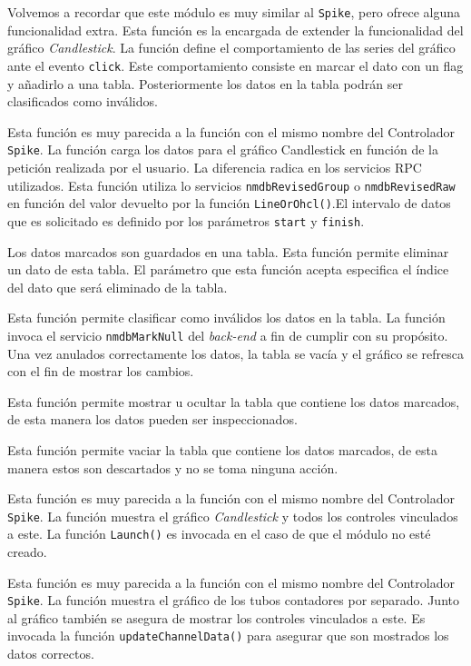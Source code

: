 \begin{description}[style=unboxed,leftmargin=0cm]
			\item[\texttt{extendCandleChart()}]
				Volvemos a recordar que este módulo es muy similar al \texttt{Spike}, pero ofrece alguna funcionalidad extra. Esta
				función es la encargada de extender la funcionalidad del gráfico \emph{Candlestick}. La función define el
				comportamiento de las series del gráfico ante el evento \texttt{click}. Este comportamiento consiste en marcar el dato
				con un flag y añadirlo a una tabla. Posteriormente los datos en la tabla podrán ser clasificados como inválidos. 
			\item[\texttt{updateCandleData(start, finish)}]
				Esta función es muy parecida a la función con el mismo nombre del Controlador \texttt{Spike}. La función carga los
				datos para el gráfico Candlestick en función de la petición realizada por el usuario. La diferencia radica en los
				servicios RPC utilizados. Esta función utiliza lo servicios \texttt{nmdbRevisedGroup} o \texttt{nmdbRevisedRaw} en
				función del valor devuelto por la función \texttt{LineOrOhcl()}.El intervalo de datos que es solicitado es definido
				por los parámetros \texttt{start} y \texttt{finish}.
			\item[\texttt{removeFromGrid(rowIndex)}]
				Los datos marcados son guardados en una tabla. Esta función permite eliminar un dato de esta tabla. El parámetro que
				esta función acepta especifica el índice del dato que será eliminado de la tabla. 
			\item[\texttt{submitGrid()}]
				Esta función permite clasificar como inválidos los datos en la tabla. La función invoca el servicio
				\texttt{nmdbMarkNull} del \emph{back-end} a fin de cumplir con su propósito. Una vez anulados correctamente los datos,
				la tabla se vacía y el gráfico se refresca con el fin de mostrar los cambios.
			\item[\texttt{showHideGrid()}]
				Esta función permite mostrar u ocultar la tabla que contiene los datos marcados, de esta manera los datos pueden ser
				inspeccionados.
			\item[\texttt{clearGrid()}]
				Esta función permite vaciar la tabla que contiene los datos marcados, de esta manera estos son descartados y no se
				toma ninguna acción.
			\item[\texttt{showCandle()}]
				Esta función es muy parecida a la función con el mismo nombre del Controlador \texttt{Spike}. La función muestra el
				gráfico \emph{Candlestick} y todos los controles vinculados a este. La función \texttt{Launch()} es invocada en el
				caso de que el módulo no esté creado.
			\item[\texttt{showChannel()}]
				Esta función es muy parecida a la función con el mismo nombre del Controlador \texttt{Spike}. La función muestra el
				gráfico de los tubos contadores por separado. Junto al gráfico también se asegura de mostrar los controles vinculados
				a este. Es invocada la función \texttt{updateChannelData()} para asegurar que son mostrados los datos correctos.
		\end{description}
